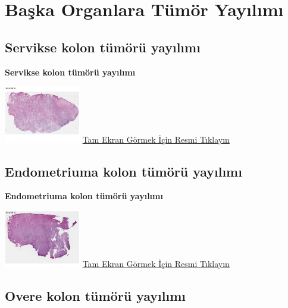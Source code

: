\documentclass[
  letterpaper,
  DIV=11,
  numbers=noendperiod]{scrreprt}
\begin{document}
\hypertarget{sec-baska-organlara-tumor-yayilimi}{%
\chapter{Başka Organlara Tümör
Yayılımı}\label{sec-baska-organlara-tumor-yayilimi}}

\hypertarget{sec-servikse-kolon-tumor-yayilimi}{%
\section{Servikse kolon tümörü
yayılımı}\label{sec-servikse-kolon-tumor-yayilimi}}

\textbf{Servikse kolon tümörü yayılımı}

\href{https://images.patolojiatlasi.com/tumor-spread/HE-cervix.html}{\includegraphics[width=0.25\textwidth,height=\textheight]{./screenshots/thumbnail_tumor-spread-cervix.png}}
\href{https://images.patolojiatlasi.com/tumor-spread/HE-cervix.html}{Tam
Ekran Görmek İçin Resmi Tıklayın}

\hypertarget{sec-endometriuma-kolon-tumor-yayilimi}{%
\section{Endometriuma kolon tümörü
yayılımı}\label{sec-endometriuma-kolon-tumor-yayilimi}}

\textbf{Endometriuma kolon tümörü yayılımı}

\href{https://images.patolojiatlasi.com/tumor-spread/HE-endometrium.html}{\includegraphics[width=0.25\textwidth,height=\textheight]{./screenshots/thumbnail_tumor-spread-endometrium.png}}
\href{https://images.patolojiatlasi.com/tumor-spread/HE-endometrium.html}{Tam
Ekran Görmek İçin Resmi Tıklayın}

\hypertarget{sec-overe-kolon-tumor-yayilimi}{%
\section{Overe kolon tümörü
yayılımı}\label{sec-overe-kolon-tumor-yayilimi}}
\end{document}
